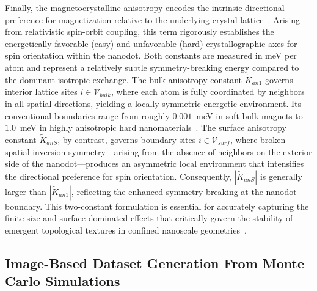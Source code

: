 \documentclass[final,5p,times,twocolumn]{elsarticle}
\begin{document}
Finally, the magnetocrystalline anisotropy encodes the intrinsic directional preference for magnetization relative to the underlying crystal lattice~\cite{cullity2011introduction}. Arising from 
relativistic spin-orbit coupling, this term rigorously establishes the energetically favorable (easy) and unfavorable (hard) crystallographic axes for spin orientation within the nanodot. Both constants are measured in meV per atom and represent a relatively subtle symmetry-breaking energy compared to the dominant isotropic 
exchange. The bulk anisotropy constant $\tilde{K}_{an1}$ governs interior lattice sites $i \in \mathcal{V}_{bulk}$, where each atom is fully coordinated by neighbors in all spatial directions, yielding a locally symmetric energetic environment. Its conventional boundaries range from roughly $0.001$~meV in soft bulk magnets to $1.0$~meV in 
highly anisotropic hard nanomaterials~\cite{cullity2011introduction}. The surface anisotropy constant $\tilde{K}_{anS}$, by contrast, 
governs boundary sites $i \in \mathcal{V}_{surf}$, where broken spatial inversion symmetry---arising from the absence of neighbors on the exterior side of the nanodot---produces an asymmetric local environment that intensifies the directional preference for spin orientation. Consequently, $|\tilde{K}_{anS}|$ is generally larger than $|\tilde{K}_{an1}|$, reflecting the enhanced symmetry-breaking at the nanodot boundary. This two-constant formulation is essential for accurately capturing the finite-size and surface-dominated effects that critically govern the stability of emergent topological textures 
in confined nanoscale geometries~\cite{fert2024electrical,borisov2021heisenberg}.

\subsection{Image-Based Dataset Generation From Monte Carlo Simulations}\label{sec:montecarlo_sim}
\end{document}
